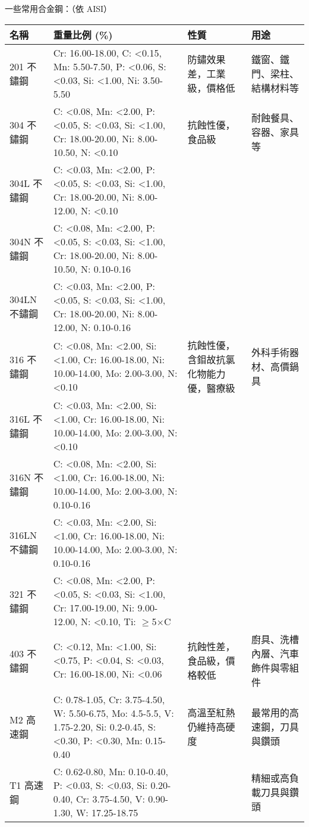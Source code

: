 \documentclass[a4paper,12pt]{report}
\begin{document}
\begin{itemize}
\begin{itemize}
一些常用合金鋼：（依 AISI）
\begin{longtable}[c]{|p{0.15\tw}|p{0.25\tw}|p{0.25\tw}|p{0.15\tw}|}
\hline
名稱 & 重量比例 (\%) & 性質 & 用途 \\\hline\endhead
201 不鏽鋼 & Cr: 16.00-18.00, C: <0.15, Mn: 5.50-7.50, P: <0.06, S: <0.03, Si: <1.00, Ni: 3.50-5.50 & 防鏽效果差，工業級，價格低 & 鐵窗、鐵門、梁柱、結構材料等 \\\hline
304 不鏽鋼 & C: <0.08, Mn: <2.00, P: <0.05, S: <0.03, Si: <1.00, Cr: 18.00-20.00, Ni: 8.00-10.50, N: <0.10 & 抗蝕性優，食品級 & 耐蝕餐具、容器、家具等 \\\cline{1-2}
304L 不鏽鋼 & C: <0.03, Mn: <2.00, P: <0.05, S: <0.03, Si: <1.00, Cr: 18.00-20.00, Ni: 8.00-12.00, N: <0.10 & & \\\cline{1-2}
304N 不鏽鋼 & C: <0.08, Mn: <2.00, P: <0.05, S: <0.03, Si: <1.00, Cr: 18.00-20.00, Ni: 8.00-10.50, N: 0.10-0.16 & & \\\cline{1-2}
304LN 不鏽鋼 & C: <0.03, Mn: <2.00, P: <0.05, S: <0.03, Si: <1.00, Cr: 18.00-20.00, Ni: 8.00-12.00, N: 0.10-0.16 & & \\\hline
316 不鏽鋼 & C: <0.08, Mn: <2.00, Si: <1.00, Cr: 16.00-18.00, Ni: 10.00-14.00, Mo: 2.00-3.00, N: <0.10 & 抗蝕性優，含鉬故抗氯化物能力優，醫療級 & 外科手術器材、高價鍋具 \\\cline{1-2}
316L 不鏽鋼 & C: <0.03, Mn: <2.00, Si: <1.00, Cr: 16.00-18.00, Ni: 10.00-14.00, Mo: 2.00-3.00, N: <0.10 & & \\\cline{1-2}
316N 不鏽鋼 & C: <0.08, Mn: <2.00, Si: <1.00, Cr: 16.00-18.00, Ni: 10.00-14.00, Mo: 2.00-3.00, N: 0.10-0.16 & & \\\cline{1-2}
316LN 不鏽鋼 & C: <0.03, Mn: <2.00, Si: <1.00, Cr: 16.00-18.00, Ni: 10.00-14.00, Mo: 2.00-3.00, N: 0.10-0.16 & & \\\hline
321 不鏽鋼 & C: <0.08, Mn: <2.00, P: <0.05, S: <0.03, Si: <1.00, Cr: 17.00-19.00, Ni: 9.00-12.00, N: <0.10, Ti: $\geq$5$\times$C & & \\\hline
403 不鏽鋼 & C: <0.12, Mn: <1.00, Si: <0.75, P: <0.04, S: <0.03, Cr: 16.00-18.00, Ni: <0.06 & 抗蝕性差，食品級，價格較低 & 廚具、洗槽內層、汽車飾件與零組件 \\\hline
M2 高速鋼 & C: 0.78-1.05, Cr: 3.75-4.50, W: 5.50-6.75, Mo: 4.5-5.5, V: 1.75-2.20, Si: 0.2-0.45, S: <0.30, P: <0.30, Mn: 0.15-0.40 & 高溫至紅熱仍維持高硬度 & 最常用的高速鋼，刀具與鑽頭 \\\cline{1-2}\cline{3-4}
T1 高速鋼 & C: 0.62-0.80, Mn: 0.10-0.40, P: <0.03, S: <0.03, Si: 0.20-0.40, Cr: 3.75-4.50, V: 0.90-1.30, W: 17.25-18.75 & & 精細或高負載刀具與鑽頭 \\\cline{1-2}\cline{3-4}

\end{longtable}
\end{itemize}
\end{itemize}
\end{document}
